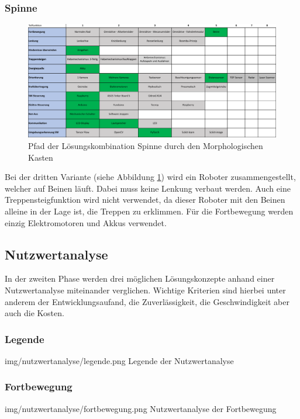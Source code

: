 \subsubsection*{Spinne}
\begin{figure}[h]
  \includegraphics[width=1.0\textwidth]{img/morphologische-kaesten/Morphologischer_Kasten_Spinne.png}
  \centering
  \caption{Pfad der Lösungskombination Spinne durch den Morphologischen Kasten}
  \label{fig:morphologischer-kasten-spinne}
\end{figure}
   
Bei der dritten Variante (siehe Abbildung \ref{fig:morphologischer-kasten-spinne}) wird ein Roboter zusammengestellt, welcher auf Beinen läuft. Dabei muss keine Lenkung verbaut werden. Auch eine Treppensteigfunktion wird nicht verwendet, da dieser Roboter mit den Beinen alleine in der Lage ist, die Treppen zu erklimmen. Für die Fortbewegung werden einzig Elektromotoren und Akkus verwendet.


\subsection*{Nutzwertanalyse}
In der zweiten Phase werden drei möglichen Lösungskonzepte anhand einer Nutzwertanalyse miteinander verglichen. Wichtige Kriterien sind hierbei unter anderem der Entwicklungsaufand, die Zuverlässigkeit, die Geschwindigkeit aber auch die Kosten.

\subsubsection*{Legende}
\image
   {img/nutzwertanalyse/legende.png}
   {Legende der Nutzwertanalyse}

\subsubsection*{Fortbewegung}
\image
   {img/nutzwertanalyse/fortbewegung.png}
   {Nutzwertanalyse der Fortbewegung}
   
